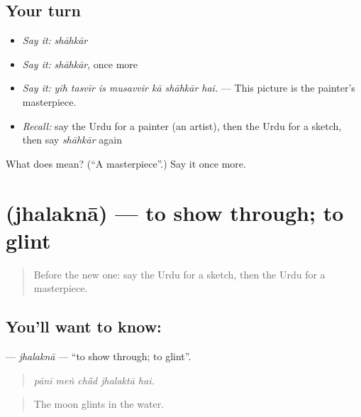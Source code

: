\subsection*{Your turn}
\begin{itemize}
\raggedright
  \item \emph{Say it:} \emph{shāhkār}
  \item \emph{Say it:} \emph{shāhkār}, once more
  \item \emph{Say it:} \emph{yih tasvīr is musavvir kā shāhkār hai.} — This picture is the painter's masterpiece.
  \item \emph{Recall:} say the Urdu for a painter (an artist), then the Urdu for a sketch, then say \emph{shāhkār} again
\end{itemize}

\begin{tcolorbox}[breakable,colback=teal!4,colframe=teal!35!black,title={Before you move on}]
What does  mean? (\textquotedblleft{}A masterpiece\textquotedblright{}.) Say it once more.
\end{tcolorbox}
\section[\texorpdfstring{\ur{جھلکنا} (jhalaknā)}{جھلکنا (jhalaknā)}]{ (jhalaknā) — to show through; to glint}

\label{lesson:UR-C515-jhalakna}



\begin{quote}
Before the new one: say the Urdu for a sketch, then the Urdu for a masterpiece.
\end{quote}

\subsection*{You'll want to know: }
\textbf{} — \emph{jhalaknā} — \textquotedblleft{}to show through; to glint\textquotedblright{}.

\begin{quote}
    
\end{quote}

\begin{quote}
\emph{pānī meṅ chā̃d jhalaktā hai.}
\end{quote}

\begin{quote}
The moon glints in the water.
\end{quote}

